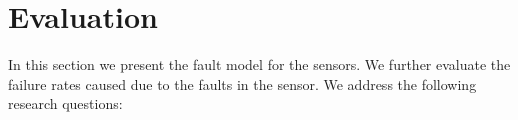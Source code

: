 \section{Evaluation}
In this section we present the fault model for the sensors. We further evaluate the failure rates caused due to the faults in the sensor. We address the following research questions:
\begin{enumerate}
	
\end{enumerate}
